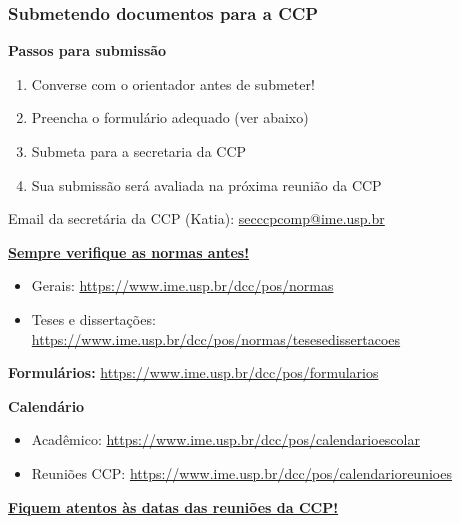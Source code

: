 \documentclass{beamer}
\begin{document}
\begin{frame}
  \frametitle{Submetendo documentos para a CCP}

  \small
  \textbf{Passos para submissão}
  \begin{enumerate}\footnotesize
    \item Converse com o orientador antes de submeter!
    \item Preencha o formulário adequado (ver abaixo)
    \item Submeta para a secretaria da CCP
    \item Sua submissão será avaliada na próxima reunião da CCP
  \end{enumerate}
  Email da secretária da CCP (Katia): \url{secccpcomp@ime.usp.br}\pause

  \textbf{\underline{Sempre verifique as normas antes!}}
  \begin{itemize}\footnotesize
    \item Gerais: {\tiny\url{https://www.ime.usp.br/dcc/pos/normas}}
      \item Teses e dissertações: {\tiny\url{https://www.ime.usp.br/dcc/pos/normas/tesesedissertacoes}}
  \end{itemize}\pause

  \textbf{Formulários:} {\tiny\url{https://www.ime.usp.br/dcc/pos/formularios}}

  \textbf{Calendário}
  \begin{itemize}\footnotesize
    \item Acadêmico: {\tiny\url{https://www.ime.usp.br/dcc/pos/calendarioescolar}}
    \item Reuniões CCP: {\tiny\url{https://www.ime.usp.br/dcc/pos/calendarioreunioes}}
  \end{itemize}\pause

  \textbf{\underline{Fiquem atentos às datas das reuniões da CCP!}}
\end{frame}
\end{document}
